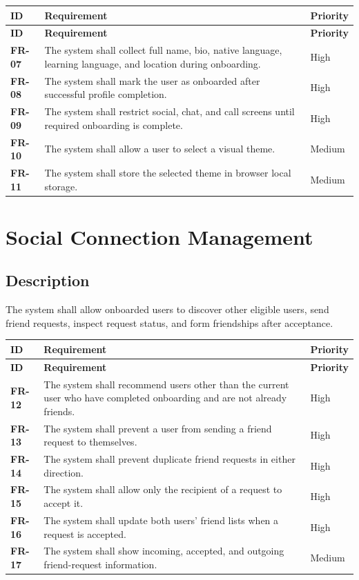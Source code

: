 \documentclass[12pt,a4paper]{report}
\newcommand{\req}[3]{\textbf{#1} & #2 & #3 \\ \hline}
\begin{document}
\begin{longtable}{|p{1.0in}|p{3.4in}|p{1.5in}|}
\hline
\rowcolor{gray!25}\textbf{ID} & \textbf{Requirement} & \textbf{Priority} \\ \hline
\endfirsthead
\hline
\rowcolor{gray!25}\textbf{ID} & \textbf{Requirement} & \textbf{Priority} \\ \hline
\endhead
\req{FR-07}{The system shall collect full name, bio, native language, learning language, and location during onboarding.}{High}
\req{FR-08}{The system shall mark the user as onboarded after successful profile completion.}{High}
\req{FR-09}{The system shall restrict social, chat, and call screens until required onboarding is complete.}{High}
\req{FR-10}{The system shall allow a user to select a visual theme.}{Medium}
\req{FR-11}{The system shall store the selected theme in browser local storage.}{Medium}
\end{longtable}

\section{Social Connection Management}
\subsection{Description}
The system shall allow onboarded users to discover other eligible users, send friend requests, inspect request status, and form friendships after acceptance.

\begin{longtable}{|p{1.0in}|p{3.4in}|p{1.5in}|}
\hline
\rowcolor{gray!25}\textbf{ID} & \textbf{Requirement} & \textbf{Priority} \\ \hline
\endfirsthead
\hline
\rowcolor{gray!25}\textbf{ID} & \textbf{Requirement} & \textbf{Priority} \\ \hline
\endhead
\req{FR-12}{The system shall recommend users other than the current user who have completed onboarding and are not already friends.}{High}
\req{FR-13}{The system shall prevent a user from sending a friend request to themselves.}{High}
\req{FR-14}{The system shall prevent duplicate friend requests in either direction.}{High}
\req{FR-15}{The system shall allow only the recipient of a request to accept it.}{High}
\req{FR-16}{The system shall update both users' friend lists when a request is accepted.}{High}
\req{FR-17}{The system shall show incoming, accepted, and outgoing friend-request information.}{Medium}
\end{longtable}
\end{document}
